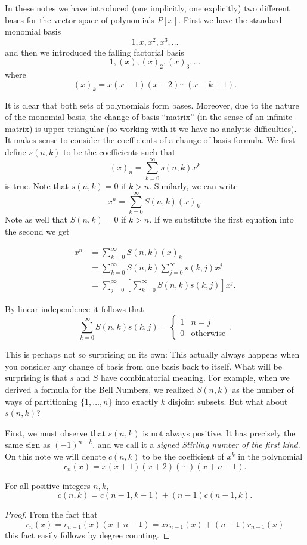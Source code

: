 In these notes we have introduced (one implicitly, one explicitly) two different bases for the vector space of polynomials $P[x]$. First we have the standard monomial basis
\[1, x, x^2, x^3, \dots\]
and then we introduced the falling factorial basis
\[1, (x), (x)_2, (x)_3, \dots\]
where 
\[(x)_k = x(x-1)(x-2)\cdots(x-k+1).\]

It is clear that both sets of polynomials form bases. Moreover, due to the nature of the monomial basis, the change of basis ``matrix'' (in the sense of an infinite matrix) is upper triangular (so working with it we have no analytic difficulties). It makes sense to consider the coefficients of a change of basis formula. We first define $s(n, k)$ to be the coefficients such that 
\[(x)_n = \sum_{k = 0}^{\infty}s(n,k)x^k\] is true. Note that $s(n,k) = 0$ if $k > n$. Similarly, we can write
\[x^n = \sum_{k = 0}^{\infty}S(n,k)(x)_k.\] Note as well that $S(n, k) = 0$ if $k > n$. If we substitute the first equation into the second we get

\begin{align*}
x^n &= \sum_{k = 0}^{\infty}S(n, k)(x)_k \\
&= \sum_{k = 0}^{\infty}S(n, k)\sum_{j = 0}^{\infty}s(k, j)x^j \\
&= \sum_{j = 0}^{\infty}\left[\sum_{k = 0}^{\infty}S(n, k)s(k, j)\right]x^j.
\end{align*}

By linear independence it follows that 
\[\sum_{k = 0}^{\infty}S(n, k)s(k, j) = \begin{cases}1 & n = j \\ 0 & \text{otherwise}\end{cases}.\]

This is perhaps not so surprising on its own: This actually always happens when you consider any change of basis from one basis back to itself. What will be surprising is that $s$ and $S$ have combinatorial meaning. For example, when we derived a formula for the Bell Numbers, we realized $S(n, k)$ as the number of ways of partitioning $\{1, \dots, n\}$ into exactly $k$ disjoint subsets. But what about $s(n, k)$?

First, we must observe that $s(n, k)$ is not always positive. It has precisely the same sign as $(-1)^{n-k}$, and we call it a \textit{signed Stirling number of the first kind}. On this note we will denote $c(n, k)$ to be the coefficient of $x^k$ in the polynomial 
\[r_n(x) = x(x + 1)(x + 2)(\cdots)(x+n-1).\]

\begin{proposition}
For all positive integers $n, k$, 
\[c(n,k) = c(n-1, k-1) + (n-1)c(n-1, k).\]
\end{proposition}
\begin{proof}
From the fact that
\[r_n(x) = r_{n-1}(x)(x + n-1) = xr_{n-1}(x) + (n-1)r_{n-1}(x)\]
this fact easily follows by degree counting.
\end{proof}
 
